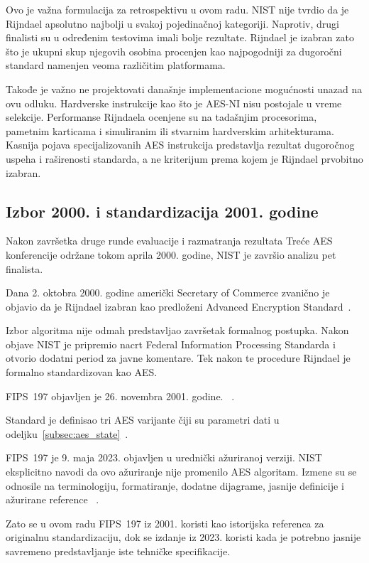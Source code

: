 Ovo je važna formulacija za retrospektivu u ovom radu. NIST nije tvrdio
da je Rijndael apsolutno najbolji u svakoj pojedinačnoj kategoriji.
Naprotiv, drugi finalisti su u određenim testovima imali bolje
rezultate. Rijndael je izabran zato što je ukupni skup njegovih osobina
procenjen kao najpogodniji za dugoročni standard namenjen veoma
različitim platformama.

Takođe je važno ne projektovati današnje implementacione mogućnosti
unazad na ovu odluku. Hardverske instrukcije kao što je AES-NI nisu
postojale u vreme selekcije. Performanse Rijndaela ocenjene su na
tadašnjim procesorima, pametnim karticama i simuliranim ili stvarnim
hardverskim arhitekturama. Kasnija pojava specijalizovanih AES
instrukcija predstavlja rezultat dugoročnog uspeha i raširenosti
standarda, a ne kriterijum prema kojem je Rijndael prvobitno izabran.


\subsection{Izbor 2000. i standardizacija 2001. godine}
\label{subsec:aes_standardizacija}

Nakon završetka druge runde evaluacije i razmatranja rezultata Treće
AES konferencije održane tokom aprila 2000. godine, NIST je završio
analizu pet finalista.

Dana 2. oktobra 2000. godine američki Secretary of Commerce zvanično je
objavio da je Rijndael izabran kao predloženi Advanced Encryption
Standard~\cite{nist-rijndael-selection-2000}.

Izbor algoritma nije odmah predstavljao završetak formalnog postupka.
Nakon objave NIST je pripremio nacrt Federal Information Processing
Standarda i otvorio dodatni period za javne komentare. Tek nakon te
procedure Rijndael je formalno standardizovan kao AES.

FIPS~197 objavljen je
26. novembra 2001. godine.
~\cite{fips197-2001}.

Standard je definisao tri AES varijante čiji su parametri dati u
odeljku~\ref{subsec:aes_state}~\cite{fips197-2001}.

FIPS~197 je 9. maja 2023. objavljen u urednički ažuriranoj verziji.
NIST eksplicitno navodi da ovo ažuriranje nije promenilo AES algoritam.
Izmene su se odnosile na terminologiju, formatiranje, dodatne dijagrame,
jasnije definicije i ažurirane reference
~\cite{fips197-2023}.

Zato se u ovom radu FIPS~197 iz 2001. koristi kao istorijska referenca
za originalnu standardizaciju, dok se izdanje iz 2023. koristi kada je
potrebno jasnije savremeno predstavljanje iste tehničke specifikacije.


